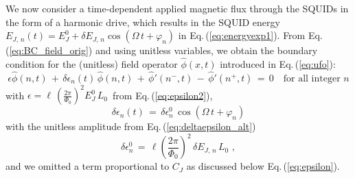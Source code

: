 \noindent
We now consider a time-dependent applied magnetic flux through the SQUIDs
in the form of a harmonic drive, which results in the SQUID energy 
$E_{J,\,n}(t) = E_J^0 + \delta E_{J,\,n} \cos(\Omega \, t + \varphi_n)$
in Eq.\,(\ref{eq:energyexp1}). 
From Eq.\,(\ref{eq:BC_field_orig}) and using unitless variables, we obtain the boundary 
condition for the (unitless) field operator $\hat{\phi}(x,t)$ introduced in Eq.\,(\ref{eq:ufo}): 
%
\begin{equation}\label{eq:BC_field_2}
\epsilon \hat{\phi}(n,t) \, + \, \delta \epsilon_n(t) \, \hat{\phi}(n,t) \, + \,
\hat{\phi}'(n^-,t) \, - \, \hat{\phi}'(n^+,t) \, = \, 0 
\quad \text{for all integer} \, \, n
\end{equation}
%
with 
$\epsilon = \ell \, \displaystyle{\left(\frac{2 \pi}{\Phi_{0}}\right)^{2}} E_J^0 \, L_0\,$
from Eq.\,(\ref{eq:epsilon2}), 
%
\begin{equation} \label{eq:deltaepsilon}
\delta \epsilon_n(t) \, = \, \delta \epsilon_n^0 \, \cos(\Omega \, t + \varphi_n)
\end{equation} 
%
with the unitless amplitude from Eq.\,(\ref{eq:deltaepsilon_alt})
%
\begin{equation} \label{eq:deltaepsilon2}
    \delta \epsilon_n^0 \, = \, \ell \left(\frac{2 \pi}{\Phi_{0}}\right)^{2} \,
\delta E_{J,\,n} \, L_0 \, \, ,
\end{equation}
%
and we omitted a term proportional to $C_J$ as discussed below
Eq.\,(\ref{eq:epsilon}).

